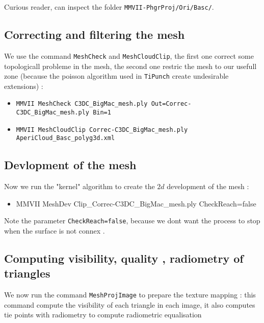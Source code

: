 Curious reader, can inspect the folder {\tt MMVII-PhgrProj/Ori/Basc/}.


\subsection{Correcting and filtering the mesh}

We use the command {\tt MeshCheck} and {\tt MeshCloudClip}, the first one
correct some topologicall probleme in the mesh, the second one restric
the mesh to our usefull zone  (because the poisson algorithm used in {\tt TiPunch}
create undesirable extensions) :

\begin{itemize}
	\item {\tt MMVII  MeshCheck C3DC\_BigMac\_mesh.ply Out=Correc-C3DC\_BigMac\_mesh.ply Bin=1}

	\item {\tt MMVII  MeshCloudClip Correc-C3DC\_BigMac\_mesh.ply  AperiCloud\_Basc\_polyg3d.xml}
\end{itemize}


\subsection{Devlopment of the mesh}

Now we run the "kernel" algorithm to create the $2d$ development of the mesh :

\begin{itemize}
    \item {MMVII MeshDev Clip\_Correc-C3DC\_BigMac\_mesh.ply CheckReach=false}
\end{itemize}

Note the parameter {\tt CheckReach=false}, because we dont want the process to stop when 
the surface is not connex .


\subsection{Computing visibility, quality , radiometry of triangles}

We now run the command  {\tt MeshProjImage} to prepare the texture mapping : this command
compute the visibility of each triangle in each image, it also computes tie points with 
radiometry to compute radiometric equalisation 

